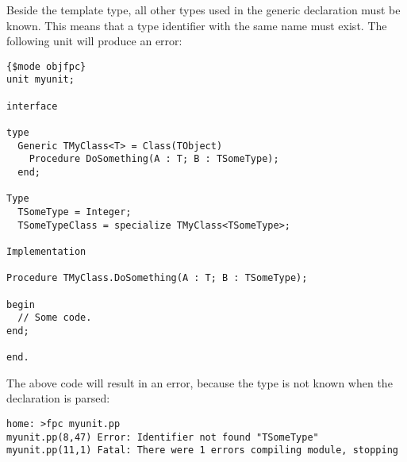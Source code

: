 Beside the template type, all other types used in the generic declaration must be
known.
This means that a type identifier with the same name must exist.
The following unit will produce an error:
\begin{verbatim}
{$mode objfpc}
unit myunit;

interface

type
  Generic TMyClass<T> = Class(TObject)
    Procedure DoSomething(A : T; B : TSomeType);
  end;

Type
  TSomeType = Integer;
  TSomeTypeClass = specialize TMyClass<TSomeType>;

Implementation

Procedure TMyClass.DoSomething(A : T; B : TSomeType);

begin
  // Some code.
end;

end.
\end{verbatim}
The above code will result in an error, because the type  is
not known when the declaration is parsed:
\begin{verbatim}
home: >fpc myunit.pp
myunit.pp(8,47) Error: Identifier not found "TSomeType"
myunit.pp(11,1) Fatal: There were 1 errors compiling module, stopping
\end{verbatim}

